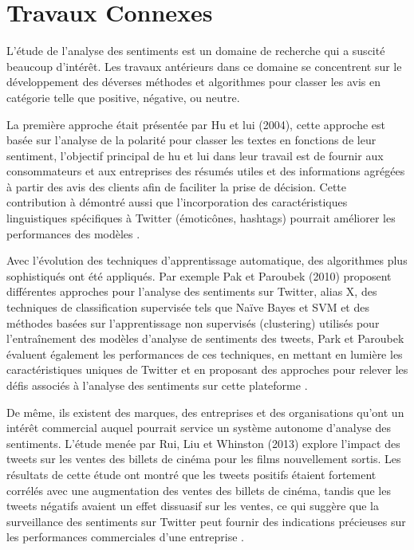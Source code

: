 \section{Travaux Connexes}
L'étude de l'analyse des sentiments est un domaine de recherche qui a suscité beaucoup d'intérêt. Les travaux antérieurs dans ce domaine se concentrent sur le développement des déverses méthodes et algorithmes pour classer les avis en catégorie telle que positive, négative, ou neutre. \par
La première approche était présentée par Hu et lui (2004), cette approche est basée sur l’analyse de la polarité pour classer les textes en fonctions de leur sentiment, l’objectif principal de hu et lui dans leur travail est de fournir aux consommateurs et aux entreprises des résumés utiles et des informations agrégées à partir des avis des clients afin de faciliter la prise de décision. Cette contribution à démontré aussi que l’incorporation des caractéristiques linguistiques spécifiques à Twitter (émoticônes, hashtags) pourrait améliorer les performances des modèles \cite{hu2004mining}. \par
Avec l’évolution des techniques d’apprentissage automatique, des algorithmes plus sophistiqués ont été appliqués. Par exemple Pak et Paroubek (2010) proposent différentes approches pour l’analyse des sentiments sur Twitter, alias X, des techniques de classification supervisée tels que Naïve Bayes et SVM et des méthodes basées sur l’apprentissage non supervisés (clustering) utilisés pour l’entraînement des modèles d’analyse de sentiments des tweets, Park et Paroubek évaluent également les performances de ces techniques, en mettant en lumière les caractéristiques uniques de Twitter et en proposant des approches pour relever les défis associés à l’analyse des sentiments sur cette plateforme \cite{pak2010twitter}. \par
De même, ils existent des marques, des entreprises et des organisations qu’ont un intérêt commercial auquel pourrait service un système autonome d’analyse des sentiments. L’étude menée par Rui, Liu et Whinston (2013) explore l’impact des tweets sur les ventes des billets de cinéma pour les films nouvellement sortis. Les résultats de cette étude ont montré que les tweets positifs étaient fortement corrélés avec une augmentation des ventes des billets de cinéma, tandis que les tweets négatifs avaient un effet dissuasif sur les ventes, ce qui suggère que la surveillance des sentiments sur Twitter peut fournir des indications précieuses sur les performances commerciales d’une entreprise \cite{rui2013whose}.  \par            

